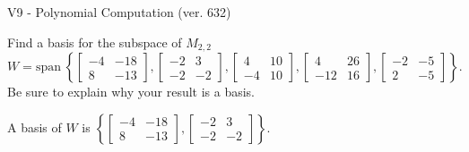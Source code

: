 \begin{exercise}
  \begin{exerciseTitle}V9 - Polynomial Computation (ver. 632)\end{exerciseTitle}
  \begin{exerciseStatement}
    Find a basis for the subspace of \(M_{2,2}\) 
\[W=\mathrm{span}\ \left\{\left[\begin{array}{cc}
-4 & -18 \\
8 & -13
\end{array}\right] , \left[\begin{array}{cc}
-2 & 3 \\
-2 & -2
\end{array}\right] , \left[\begin{array}{cc}
4 & 10 \\
-4 & 10
\end{array}\right] , \left[\begin{array}{cc}
4 & 26 \\
-12 & 16
\end{array}\right] , \left[\begin{array}{cc}
-2 & -5 \\
2 & -5
\end{array}\right]\right\}.\]
 Be sure to explain why your result is a basis.


  \end{exerciseStatement}
  \begin{exerciseAnswer}
   A basis of \(W\) is  \(\left\{\left[\begin{array}{cc}
-4 & -18 \\
8 & -13
\end{array}\right] , \left[\begin{array}{cc}
-2 & 3 \\
-2 & -2
\end{array}\right]\right\}\).
  


  \end{exerciseAnswer}
\end{exercise}
